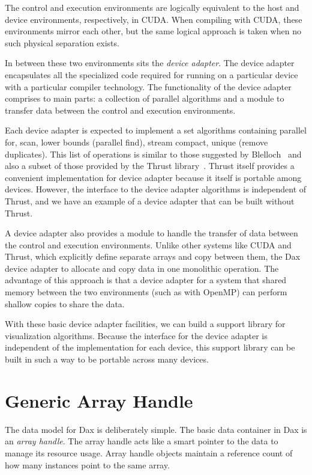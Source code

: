 \documentclass[conference]{IEEEtran}
\newcommand*{\lcite}[1]{~\cite{#1}}
\newcommand*{\scite}[1]{~\cite{#1}}
\newcommand*{\keyterm}[1]{\emph{#1}}
\begin{document}
The control and execution environments are logically equivalent to the host
and device environments, respectively, in CUDA.  When compiling with CUDA,
these environments mirror each other, but the same logical approach is
taken when no such physical separation exists.

In between these two environments sits the \keyterm{device adapter}.  The
device adapter encapsulates all the specialized code required for running
on a particular device with a particular compiler technology.  The
functionality of the device adapter comprises to main parts: a collection
of parallel algorithms and a module to transfer data between the control
and execution environments.

Each device adapter is expected to implement a set algorithms containing
parallel for, scan, lower bounds (parallel find), stream compact, unique
(remove duplicates).  This list of operations is similar to those suggested
by Blelloch\scite{Blelloch1990} and also a subset of those provided by the
Thrust library\lcite{Thrust}.  Thrust itself provides a convenient
implementation for device adapter because it itself is portable among
devices.  However, the interface to the device adapter algorithms is
independent of Thrust, and we have an example of a device adapter that can
be built without Thrust.

A device adapter also provides a module to handle the transfer of data
between the control and execution environments.  Unlike other systems like
CUDA and Thrust, which explicitly define separate arrays and copy between
them, the Dax device adapter to allocate and copy data in one monolithic
operation.  The advantage of this approach is that a device adapter for a
system that shared memory between the two environments (such as with
OpenMP) can perform shallow copies to share the data.

With these basic device adapter facilities, we can build a support library
for visualization algorithms.  Because the interface for the device adapter
is independent of the implementation for each device, this support library
can be built in such a way to be portable across many devices.

\section{Generic Array Handle}
\label{sec:GenericArrayHandle}

\noindent
The data model for Dax is deliberately simple.  The basic data container in
Dax is an \keyterm{array handle}.  The array handle acts like a smart
pointer to the data to manage its resource usage.  Array handle objects
maintain a reference count of how many instances point to the same array.
\end{document}
